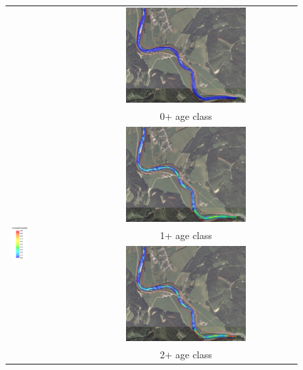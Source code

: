 \centering
\begin{figure}[h!]                                                   	%
	\begin{tabular}{ l  c }
		
		& \includegraphics[width=0.56\textwidth,valign=t]{images/0_1300}\\
		& 0+ age class\\
		\multirow{4}{*}{\includegraphics[width=0.3\textwidth,valign=t]{images/suitability_index}}& \includegraphics[width=0.56\textwidth,valign=t]{images/1_1300}\\
		& 1+ age class\\
		& \includegraphics[width=0.56\textwidth,valign=t]{images/2_1300}\\
		& 2+ age class
		

\end{tabular}
\end{figure}
